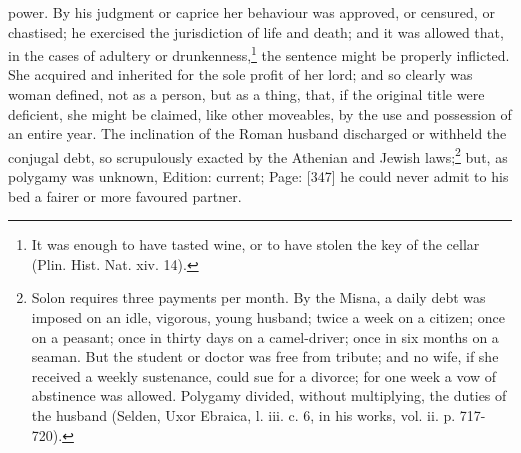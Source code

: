 power. By his judgment or caprice her behaviour was approved, or censured, or chastised; he exercised the jurisdiction of life and death; and it was allowed that, in the cases of adultery or drunkenness,\footnote{It was enough to have tasted wine, or to have stolen the key of the cellar (Plin. Hist. Nat. xiv. 14).} the sentence might be properly inflicted. She acquired and inherited for the sole profit of her lord; and so clearly was woman defined, not as a person, but as a thing, that, if the original title were deficient, she might be claimed, like other moveables, by the use and possession of an entire year. The inclination of the Roman husband discharged or withheld the conjugal debt, so scrupulously exacted by the Athenian and Jewish laws;\footnote{Solon requires three payments per month. By the Misna, a daily debt was imposed on an idle, vigorous, young husband; twice a week on a citizen; once on a peasant; once in thirty days on a camel-driver; once in six months on a seaman. But the student or doctor was free from tribute; and no wife, if she received a weekly sustenance, could sue for a divorce; for one week a vow of abstinence was allowed. Polygamy divided, without multiplying, the duties of the husband (Selden, Uxor Ebraica, l. iii. c. 6, in his works, vol. ii. p. 717-720).} but, as polygamy was unknown, Edition: current; Page: [347] he could never admit to his bed a fairer or more favoured partner.

